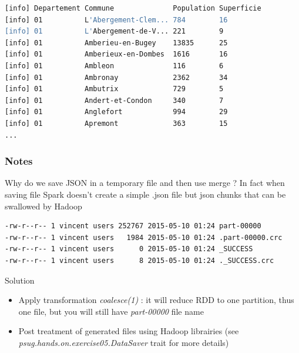 \documentclass[slidetop,9pt,utf8]{beamer}
\begin{document}
\begin{CJK}{UTF8}{gbsn}
\begin{frame}[fragile]
  \begin{lstlisting}[label=ResultOfShowMethod, caption=Result of Show Method, language=bash, style=terminal]
[info] Departement Commune              Population Superficie
[info] 01          L'Abergement-Clem... 784        16        
[info] 01          L'Abergement-de-V... 221        9         
[info] 01          Amberieu-en-Bugey    13835      25        
[info] 01          Amberieux-en-Dombes  1616       16        
[info] 01          Ambleon              116        6         
[info] 01          Ambronay             2362       34        
[info] 01          Ambutrix             729        5         
[info] 01          Andert-et-Condon     340        7         
[info] 01          Anglefort            994        29        
[info] 01          Apremont             363        15             
...
  \end{lstlisting}

\end{frame}

\begin{frame}[fragile]
  \frametitle{Notes}

  \begin{exampleblock}{Why do we save JSON in a temporary file and then use merge ?}
    In fact when saving file Spark doesn't create a simple .json file but json chunks that can be swallowed by Hadoop
  \end{exampleblock}

  \begin{lstlisting}[label=contentOfTemporaryFile, caption=Content of Temporary File, language=bash, style=terminal]
-rw-r--r-- 1 vincent users 252767 2015-05-10 01:24 part-00000
-rw-r--r-- 1 vincent users   1984 2015-05-10 01:24 .part-00000.crc
-rw-r--r-- 1 vincent users      0 2015-05-10 01:24 _SUCCESS
-rw-r--r-- 1 vincent users      8 2015-05-10 01:24 ._SUCCESS.crc
  \end{lstlisting}

  \begin{exampleblock}{Solution}
    \begin{itemize}
      \item Apply transformation \textit{coalesce(1)} : it will reduce RDD to one partition, thus one file, but you will still have \textit{part-00000} file name
      \item Post treatment of generated files using Hadoop librairies (see \textit{psug.hands.on.exercise05.DataSaver} trait for more details)
    \end{itemize}
  \end{exampleblock}


\end{frame}
\end{CJK}
\end{document}
